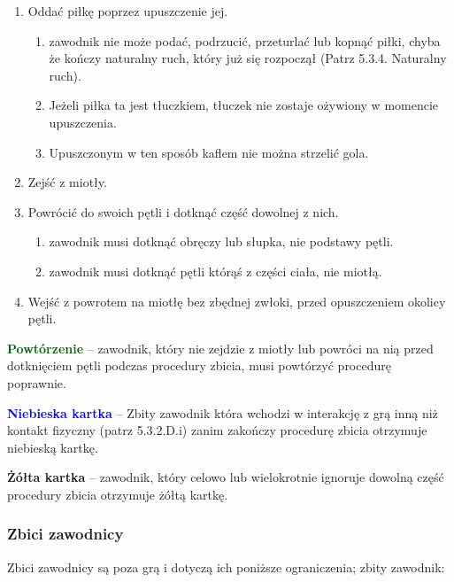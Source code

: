 \documentclass[12pt]{article}
\newcommand\yellowcard[1]{\bgroup\textcolor{darkyellow}{\textbf{#1}}}
\newcommand\bluecard[1]{\bgroup\textcolor{blue}{\textbf{#1}}}
\newcommand\other[1]{\bgroup\textcolor{darkgreen}{\textbf{#1}}}
\begin{document}
\begin{enumerate}
	\item
	      Oddać piłkę poprzez upuszczenie jej.

	      \begin{enumerate}
		      \item
		            zawodnik nie może podać, podrzucić, przeturlać lub kopnąć piłki,
		            chyba że kończy naturalny ruch, który już się rozpoczął (Patrz
		            5.3.4. Naturalny ruch).
		      \item
		            Jeżeli piłka ta jest tłuczkiem, tłuczek nie zostaje ożywiony w
		            momencie upuszczenia.
		      \item
		            Upuszczonym w ten sposób kaflem nie można strzelić gola.
	      \end{enumerate}
	\item
	      Zejść z miotły.
	\item
	      Powrócić do swoich pętli i dotknąć część dowolnej z nich.

	      \begin{enumerate}
		      \item
		            zawodnik musi dotknąć obręczy lub słupka, nie podstawy pętli.
		      \item
		            zawodnik musi dotknąć pętli którąś z części ciała, nie miotłą.
	      \end{enumerate}
	\item Wejść z powrotem na miotłę bez zbędnej zwłoki, przed opuszczeniem
	      okolicy pętli.

\end{enumerate}

\other{Powtórzenie} -- zawodnik, który nie zejdzie z miotły lub powróci
na nią przed dotknięciem pętli podczas procedury zbicia, musi powtórzyć
procedurę poprawnie.

\bluecard{Niebieska kartka} -- Zbity zawodnik która wchodzi w interakcję z
grą inną niż kontakt fizyczny (patrz 5.3.2.D.i) zanim zakończy procedurę
zbicia otrzymuje niebieską kartkę.

\yellowcard{Żółta kartka} -- zawodnik, który celowo lub wielokrotnie ignoruje
dowolną część procedury zbicia otrzymuje żółtą kartkę.

\subsubsection{Zbici zawodnicy}

Zbici zawodnicy są poza grą i dotyczą ich poniższe ograniczenia; zbity
zawodnik:
\end{document}
